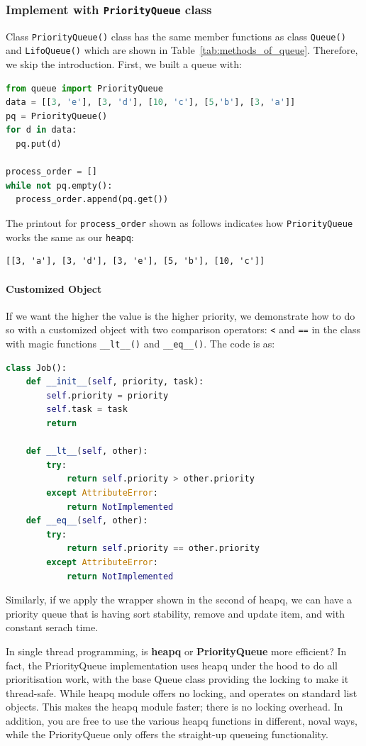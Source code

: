 \documentclass[../main.tex]{subfiles}
\begin{document}
\subsubsection{Implement with \texttt{PriorityQueue} class} Class \texttt{PriorityQueue()} class has the same member functions as class \texttt{Queue()} and \texttt{LifoQueue()} which are shown in Table~\ref{tab:methods_of_queue}. Therefore, we skip the introduction. First, we built a queue with:
\begin{lstlisting}[language=Python]
from queue import PriorityQueue
data = [[3, 'e'], [3, 'd'], [10, 'c'], [5,'b'], [3, 'a']]
pq = PriorityQueue()
for d in data:
  pq.put(d)
  
process_order = []
while not pq.empty():
  process_order.append(pq.get())
\end{lstlisting}
The printout for \texttt{process\_order} shown as follows indicates how \texttt{PriorityQueue} works the same as our \texttt{heapq}:
\begin{lstlisting}
[[3, 'a'], [3, 'd'], [3, 'e'], [5, 'b'], [10, 'c']]
\end{lstlisting}
\paragraph{Customized Object} If we want the higher the value is the higher priority, we demonstrate how to do so with a customized object with two comparison operators: \texttt{<} and \texttt{==} in the class with magic functions \texttt{\_\_lt\_\_()} and \texttt{\_\_eq\_\_()}. The code is as:
\begin{lstlisting}[language = Python]
class Job():
    def __init__(self, priority, task):
        self.priority = priority
        self.task = task
        return

    def __lt__(self, other):
        try:
            return self.priority > other.priority
        except AttributeError:
            return NotImplemented
    def __eq__(self, other): 
        try:
            return self.priority == other.priority
        except AttributeError:
            return NotImplemented
\end{lstlisting}

Similarly, if we apply the wrapper shown in the second of heapq, we can have a priority queue that is having sort stability, remove and update item, and with constant serach time. 
\begin{bclogo}[couleur = blue!30, arrondi=0.1,logo=\bccrayon,ombre=true]{In single thread programming, is \textbf{heapq} or \textbf{PriorityQueue} more efficient?} In fact, the PriorityQueue implementation uses heapq under the hood to do all prioritisation work, with the base Queue class providing the locking to make it thread-safe. While heapq module offers no locking, and operates on standard list objects. This makes the heapq module faster; there is no locking overhead. In addition, you are free to use the various heapq functions in different, noval ways, while the PriorityQueue only offers the straight-up queueing functionality. 
\end{bclogo}
\end{document}
